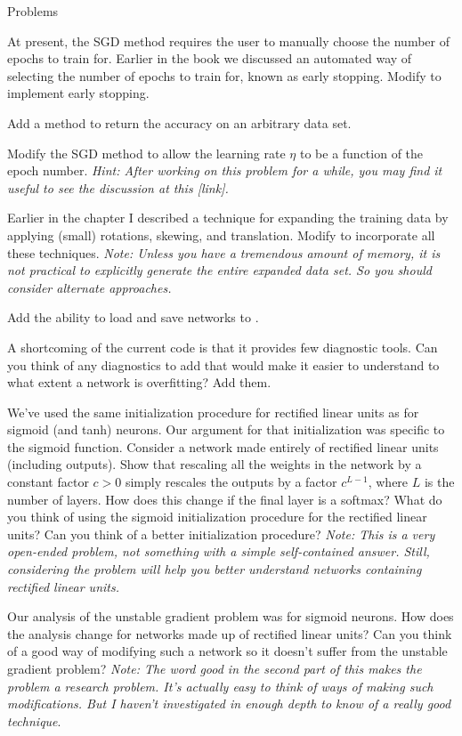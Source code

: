 \documentclass[a4paper,twoside,10pt]{book}
\begin{document}
\begin{exercize}{Problems}
\item At present, the SGD method requires the user to manually choose the number of epochs to train for. Earlier in the book we discussed an automated way of selecting the number of epochs to train for, known as early stopping. Modify  to implement early stopping.
\item Add a  method to return the accuracy on an arbitrary data set.
\item Modify the SGD method to allow the learning rate $\eta$ to be a function of the epoch number. \textit{Hint: After working on this problem for a while, you may find it useful to see the discussion at this [link].}
\item Earlier in the chapter I described a technique for expanding the training data by applying (small) rotations, skewing, and translation. Modify  to incorporate all these techniques. \textit{Note: Unless you have a tremendous amount of memory, it is not practical to explicitly generate the entire expanded data set. So you should consider alternate approaches.}
\item Add the ability to load and save networks to .
\item A shortcoming of the current code is that it provides few diagnostic tools. Can you think of any diagnostics to add that would make it easier to understand to what extent a network is overfitting? Add them.
\item We've used the same initialization procedure for rectified linear units as for sigmoid (and tanh) neurons. Our argument for that initialization was specific to the sigmoid function. Consider a network made entirely of rectified linear units (including outputs). Show that rescaling all the weights in the network by a constant factor $c>0$ simply rescales the outputs by a factor $c^{L−1}$, where $L$ is the number of layers. How does this change if the final layer is a softmax? What do you think of using the sigmoid initialization procedure for the rectified linear units? Can you think of a better initialization procedure? \textit{Note: This is a very open-ended problem, not something with a simple self-contained answer. Still, considering the problem will help you better understand networks containing rectified linear units.}
\item Our analysis of the unstable gradient problem was for sigmoid neurons. How does the analysis change for networks made up of rectified linear units? Can you think of a good way of modifying such a network so it doesn't suffer from the unstable gradient problem? \textit{Note: The word good in the second part of this makes the problem a research problem. It's actually easy to think of ways of making such modifications. But I haven't investigated in enough depth to know of a really good technique}.
\end{exercize}
\end{document}
